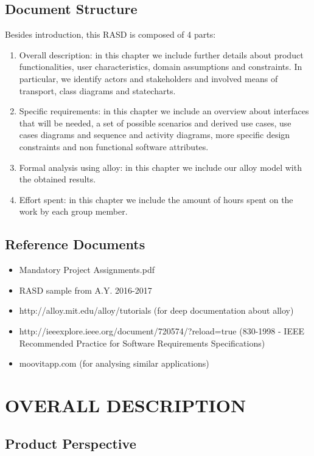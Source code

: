\documentclass[a4paper,leqno]{book}
\begin{document}
\section{Document Structure}

Besides introduction, this RASD is composed of 4 parts:

\begin{enumerate}
	\item Overall description: in this chapter we include further details about product functionalities, user characteristics, domain assumptions and constraints. In particular, we identify actors and stakeholders and involved means of transport, class diagrams and statecharts.
	\item Specific requirements: in this chapter we include an overview about interfaces that will be needed, a set of possible scenarios and derived use cases, use cases diagrams and sequence and activity diagrams, more specific design constraints and non functional software attributes.
	\item  Formal analysis using alloy: in this chapter we include our alloy model with the obtained results.
	\item  Effort spent: in this chapter we include the amount of hours spent on the work by each group member.
\end{enumerate}

\section{Reference Documents}
\begin{itemize}
	\item Mandatory Project Assignments.pdf
	\item RASD sample from A.Y. 2016-2017
	\item http://alloy.mit.edu/alloy/tutorials (for deep documentation about alloy)
	\item http://ieeexplore.ieee.org/document/720574/?reload=true (830-1998 - IEEE Recommended Practice for Software Requirements Specifications)
	\item moovitapp.com (for analysing similar applications)
\end{itemize}



\chapter{OVERALL DESCRIPTION}
\section{Product Perspective}
\end{document}
